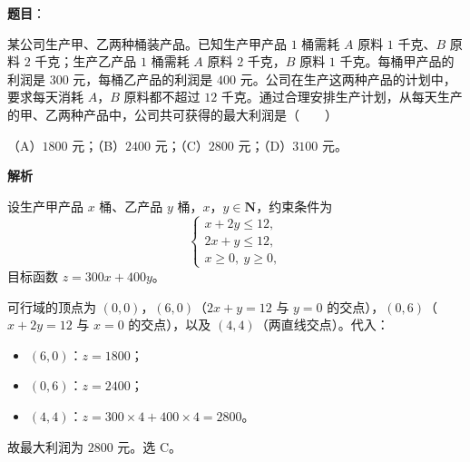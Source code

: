 \begin{answer}

\textbf{题目}：

某公司生产甲、乙两种桶装产品。已知生产甲产品 $1$ 桶需耗 $A$ 原料 $1$ 千克、$B$ 原料 $2$ 千克；生产乙产品 $1$ 桶需耗 $A$ 原料 $2$ 千克，$B$ 原料 $1$ 千克。每桶甲产品的利润是 $300$ 元，每桶乙产品的利润是 $400$ 元。公司在生产这两种产品的计划中，要求每天消耗 $A$，$B$ 原料都不超过 $12$ 千克。通过合理安排生产计划，从每天生产的甲、乙两种产品中，公司共可获得的最大利润是\mbox{（　　）}

（A）$1800$ 元；（B）$2400$ 元；（C）$2800$ 元；（D）$3100$ 元。

\textbf{解析}

设生产甲产品 $x$ 桶、乙产品 $y$ 桶，$x$，$y\in\mathbf N$，约束条件为
\nopagebreak[4]
\[\begin{cases}x+2y\leqslant12,\\2x+y\leqslant12,\\x\geqslant0,\ y\geqslant0,\end{cases}\]
目标函数 $z=300x+400y$。

可行域的顶点为 $(0,0)$，$(6,0)$（$2x+y=12$ 与 $y=0$ 的交点），$(0,6)$（$x+2y=12$ 与 $x=0$ 的交点），以及 $(4,4)$（两直线交点）。代入：

\begin{itemize}
\item $(6,0)$：$z=1800$；
\item $(0,6)$：$z=2400$；
\item $(4,4)$：$z=300\times4+400\times4=2800$。
\end{itemize}

故最大利润为 $2800$ 元。选 C。


\end{answer}
